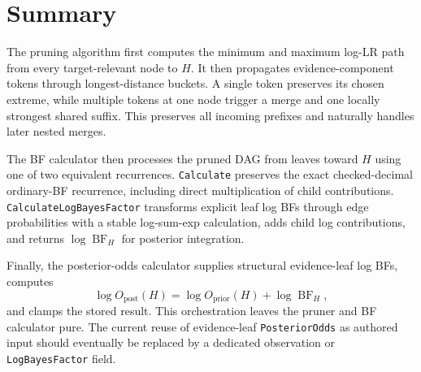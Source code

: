 \documentclass[11pt]{article}
\newcommand{\BF}{\operatorname{BF}}
\begin{document}
\section{Summary}

The pruning algorithm first computes the minimum and maximum log-LR path from
every target-relevant node to \(H\).  It then propagates evidence-component
tokens through longest-distance buckets.  A single token preserves its chosen
extreme, while multiple tokens at one node trigger a merge and one locally
strongest shared suffix.  This preserves all incoming prefixes and naturally
handles later nested merges.

The BF calculator then processes the pruned DAG from leaves toward \(H\) using
one of two equivalent recurrences.  \texttt{Calculate} preserves the exact
checked-decimal ordinary-BF recurrence, including direct multiplication of
child contributions.  \texttt{CalculateLogBayesFactor} transforms explicit
leaf log BFs through edge probabilities with a stable log-sum-exp calculation,
adds child log contributions, and returns \(\log\BF_H\) for posterior
integration.

Finally, the posterior-odds calculator supplies structural evidence-leaf log
BFs, computes
\[
    \log O_{\mathrm{post}}(H)
      =\log O_{\mathrm{prior}}(H)+\log\BF_H,
\]
and clamps the stored result.  This orchestration leaves the pruner and BF
calculator pure.  The current reuse of evidence-leaf \texttt{PosteriorOdds} as
authored input should eventually be replaced by a dedicated observation or
\texttt{LogBayesFactor} field.
\end{document}
